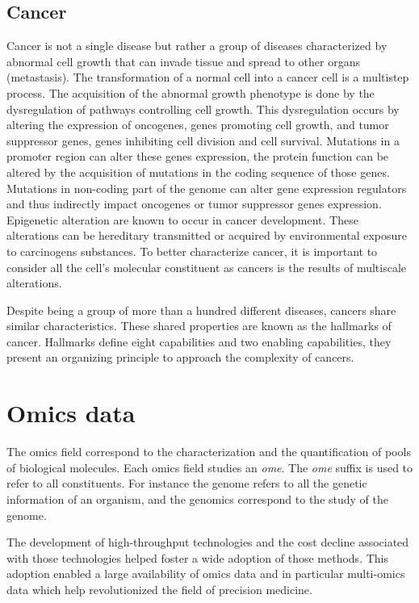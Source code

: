 \documentclass[../main.tex]{subfiles}
\begin{document}
 \subsection{Cancer}
	 Cancer is not a single disease but rather a group of diseases characterized by abnormal cell growth that can invade tissue and spread to other organs (metastasis).
	 The transformation of a normal cell into a cancer cell is a multistep process.
	 The acquisition of the abnormal growth phenotype is done by the dysregulation of pathways controlling cell growth.
	 This dysregulation occurs by altering the expression of oncogenes, genes promoting cell growth, and tumor suppressor genes, genes inhibiting cell division and cell survival.
	 Mutations in a promoter region can alter these genes expression, the protein function can be altered by the acquisition of mutations in the coding sequence of those genes.
	 Mutations in non-coding part of the genome can alter gene expression regulators and thus indirectly impact oncogenes or tumor suppressor genes expression.
	 Epigenetic alteration are known to occur in cancer development.
	 These alterations can be hereditary transmitted or acquired by environmental exposure to carcinogens substances.
	 To better characterize cancer, it is important to consider all the cell's molecular constituent as cancers is the results of multiscale alterations.

	 Despite being a group of more than a hundred different diseases, cancers share similar characteristics.
	 These shared properties are known as the hallmarks of cancer.
	 Hallmarks define eight capabilities and two enabling capabilities, they present an organizing principle to approach the complexity of cancers.

\section{Omics data}
 The omics field correspond to the characterization and the quantification of pools of biological molecules.
 Each omics field studies an \textit{ome}.
 The \textit{ome} suffix is used to refer to all constituents.
 For instance the genome refers to all the genetic information of an organism, and the genomics correspond to the study of the genome.

 The development of high-throughput technologies and the cost decline associated with those technologies helped foster a wide adoption of those methods.
 This adoption enabled a large availability of omics data and in particular multi-omics data which help revolutionized the field of precision medicine.
\end{document}

